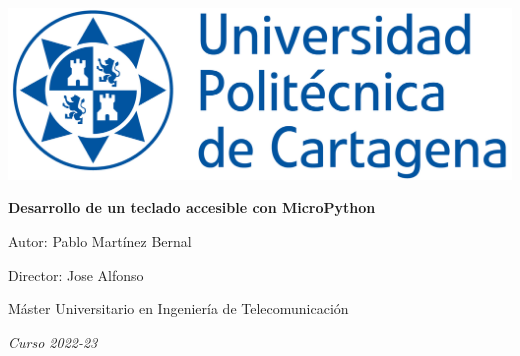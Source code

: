 \begin{titlepage}
    \vspace{5cm}
    {\centering
        \hspace{3cm}\includegraphics[width=.7\textwidth]{images/UPCT-frontlogo.jpg}
        
        \vspace{5cm}
        \hspace{2cm}\huge\textbf{\color{RoyalBlue}Desarrollo de un teclado accesible con MicroPython} 
        
        {\LARGE
        \vspace*{\fill}
        \begin{flushright}
          \item Autor: Pablo Martínez Bernal
          \item Director: Jose Alfonso %
          \item Máster Universitario en Ingeniería de Telecomunicación
          \item \textit{Curso 2022-23}   
        \end{flushright}
        }
    }
\end{titlepage}
